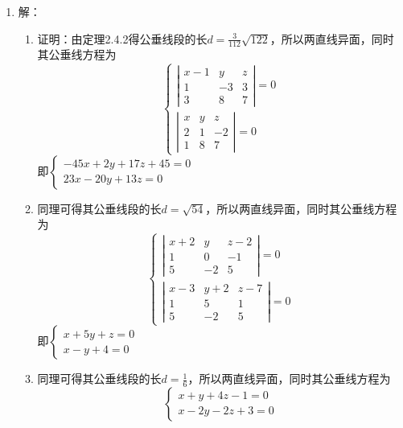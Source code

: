 \documentclass[UTF8]{ctexart}
\begin{document}
\begin{enumerate}
\item 解：\begin{enumerate}[(1)]
\item 证明：由定理2.4.2得公垂线段的长$d=\displaystyle\frac{3}{112}\sqrt{122}$，所以两直线异面，同时其公垂线方程为$$\left\{\begin{array}{l}\left|\begin{array}{ccc}x-1&y&z\\1&-3&3\\3&8&7\end{array}\right|=0\\
\left|\begin{array}{ccc}x&y&z\\2&1&-2\\1&8&7\end{array}\right|=0\end{array}\right.$$即$\left\{\begin{array}{l}-45x+2y+17z+45=0\\23x-20y+13z=0\end{array}\right.$
\item 同理可得其公垂线段的长$d=\sqrt{54}$，所以两直线异面，同时其公垂线方程为
$$\left\{\begin{array}{l}\left|\begin{array}{ccc}x+2&y&z-2\\1&0&-1\\5&-2&5\end{array}\right|=0\\
\left|\begin{array}{ccc}x-3&y+2&z-7\\1&5&1\\5&-2&5\end{array}\right|=0\end{array}\right.$$即$\left\{\begin{array}{l}x+5y+z=0\\x-y+4=0\end{array}\right.$
\item 同理可得其公垂线段的长$d=\displaystyle\frac{1}{6}$，所以两直线异面，同时其公垂线方程为$$\left\{\begin{array}{l}x+y+4z-1=0\\x-2y-2z+3=0\end{array}\right.$$
\end{enumerate}


\end{enumerate}
\end{document}
